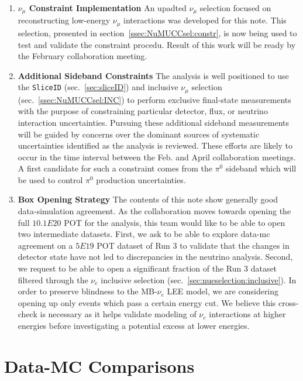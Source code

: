 \documentclass[a4paper]{article}
\begin{document}
\begin{enumerate}
    \item \textbf{$\nu_{\mu}$ Constraint Implementation} An upadted $\nu_{\mu}$ selection focused on reconstructing low-energy $\nu_{\mu}$ interactions was developed for this note. This selection, presented in section~\ref{ssec:NuMUCCsel:constr}, is now being used to test and validate the constraint procedu. Result of this work will be ready by the February collaboration meeting.%
    \item \textbf{Additional Sideband Constraints} The analysis is well positioned to use the \texttt{SliceID} (sec.~\ref{sec:sliceID}) and inclusive $\nu_{\mu}$ selection (sec.~\ref{ssec:NuMUCCsel:INC}) to perform exclusive final-state measurements with the purpose of constraining particular detector, flux, or neutrino interaction uncertainties. Pursuing these additional sideband measurements will be guided by concerns over the dominant sources of systematic uncertainties identified as the analysis is reviewed. These efforts are likely to occur in the time interval between the Feb. and April collaboration meetings. A first candidate for such a constraint comes from the $\pi^0$ sideband which will be used to control $\pi^0$ production uncertainties.
    \item \textbf{Box Opening Strategy} The contents of this note show generally good data-simulation agreement. As the collaboration moves towards opening the full $10.1E20$ POT for the analysis, this team would like to be able to open two intermediate datasets. First, we ask to be able to explore data-mc agreement on a $5E19$ POT dataset of Run 3 to validate that the changes in detector state have not led to discrepancies in the neutrino analysis. Second, we request to be able to open a significant fraction of the Run 3 dataset filtered through the $\nu_e$ inclusive selection (sec.~\ref{sec:nueselection:inclusive}). In order to preserve blindness to the MB-$\nu_e$ LEE model, we are considering opening up only events which pass a certain energy cut. We believe this cross-check is necessary as it helps validate modeling of $\nu_e$ interactions at higher energies before investigating a potential excess at lower energies.

\end{enumerate}{}

\newpage

\appendix

\section{Data-MC Comparisons}
\label{sec:datamc:plots}
\end{document}
